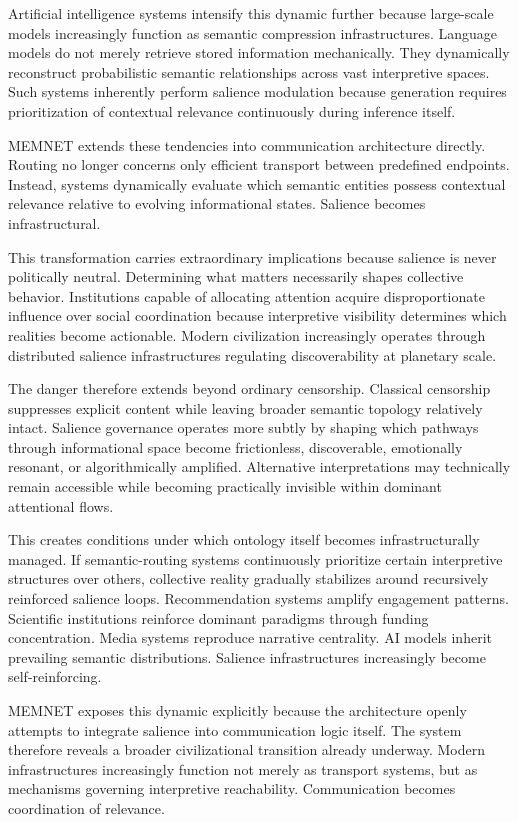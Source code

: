 \documentclass[11pt,a4paper]{article}
\begin{document}
Artificial intelligence systems intensify this dynamic further because large-scale models increasingly function as semantic compression infrastructures. Language models do not merely retrieve stored information mechanically. They dynamically reconstruct probabilistic semantic relationships across vast interpretive spaces. Such systems inherently perform salience modulation because generation requires prioritization of contextual relevance continuously during inference itself.

MEMNET extends these tendencies into communication architecture directly. Routing no longer concerns only efficient transport between predefined endpoints. Instead, systems dynamically evaluate which semantic entities possess contextual relevance relative to evolving informational states. Salience becomes infrastructural.

This transformation carries extraordinary implications because salience is never politically neutral. Determining what matters necessarily shapes collective behavior. Institutions capable of allocating attention acquire disproportionate influence over social coordination because interpretive visibility determines which realities become actionable. Modern civilization increasingly operates through distributed salience infrastructures regulating discoverability at planetary scale.

The danger therefore extends beyond ordinary censorship. Classical censorship suppresses explicit content while leaving broader semantic topology relatively intact. Salience governance operates more subtly by shaping which pathways through informational space become frictionless, discoverable, emotionally resonant, or algorithmically amplified. Alternative interpretations may technically remain accessible while becoming practically invisible within dominant attentional flows.

This creates conditions under which ontology itself becomes infrastructurally managed. If semantic-routing systems continuously prioritize certain interpretive structures over others, collective reality gradually stabilizes around recursively reinforced salience loops. Recommendation systems amplify engagement patterns. Scientific institutions reinforce dominant paradigms through funding concentration. Media systems reproduce narrative centrality. AI models inherit prevailing semantic distributions. Salience infrastructures increasingly become self-reinforcing.

MEMNET exposes this dynamic explicitly because the architecture openly attempts to integrate salience into communication logic itself. The system therefore reveals a broader civilizational transition already underway. Modern infrastructures increasingly function not merely as transport systems, but as mechanisms governing interpretive reachability. Communication becomes coordination of relevance.
\end{document}
